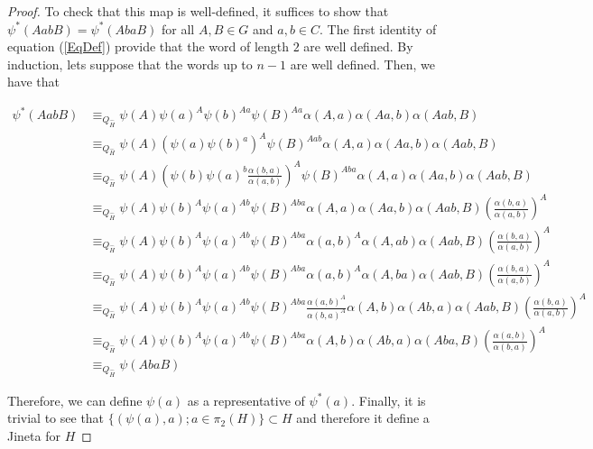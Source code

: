 \documentclass{article}
\begin{document}
\begin{proof}
    To check that this map is well-defined, it suffices to show that $\psi^*(AabB) = \psi^*(AbaB)$ for all $A, B \in G$ and $a, b \in C$. The first identity of equation (\ref{EqDef}) provide that the word of length $2$ are well defined. By induction, lets suppose that the words up to $n-1$ are well defined. Then, we have that
    
    \begin{align*}
        \psi^*(AabB) & \equiv_{Q_{\hat{H}}} \psi(A)\psi(a)^A \psi(b)^{Aa} \psi(B)^{Aa} \alpha(A,a)\alpha(Aa,b)\alpha(Aab,B) \\ 
        & \equiv_{Q_{\hat{H}}} \psi(A) \left(\psi(a) \psi(b)^{a}\right)^{A} \psi(B)^{Aab} \alpha(A,a)\alpha(Aa,b)\alpha(Aab,B) \\ 
        & \equiv_{Q_{\hat{H}}} \psi(A) \left(\psi(b) \psi(a)^{b} \frac{\alpha(b,a)}{\alpha(a,b)}\right)^{A} \psi(B)^{Aba} \alpha(A,a)\alpha(Aa,b)\alpha(Aab,B) \\ 
        & \equiv_{Q_{\hat{H}}} \psi(A) \psi(b)^A \psi(a)^{Ab}  \psi(B)^{Aba} \alpha(A,a)\alpha(Aa,b)\alpha(Aab,B) \left(\frac{\alpha(b,a)}{\alpha(a,b)}\right)^{A} \\ 
        & \equiv_{Q_{\hat{H}}} \psi(A) \psi(b)^A \psi(a)^{Ab}  \psi(B)^{Aba} \alpha(a,b)^A\alpha(A,ab)\alpha(Aab,B) \left(\frac{\alpha(b,a)}{\alpha(a,b)}\right)^{A}\\
        & \equiv_{Q_{\hat{H}}} \psi(A) \psi(b)^A \psi(a)^{Ab}  \psi(B)^{Aba} \alpha(a,b)^A\alpha(A,ba)\alpha(Aab,B)\left(\frac{\alpha(b,a)}{\alpha(a,b)}\right)^{A} \\ 
        & \equiv_{Q_{\hat{H}}} \psi(A) \psi(b)^A \psi(a)^{Ab}  \psi(B)^{Aba} \frac{\alpha(a,b)^A}{\alpha(b,a)^A}\alpha(A,b) \alpha(Ab,a)\alpha(Aab,B) \left(\frac{\alpha(b,a)}{\alpha(a,b)}\right)^{A}\\ 
        & \equiv_{Q_{\hat{H}}} \psi(A) \psi(b)^A \psi(a)^{Ab}  \psi(B)^{Aba} \alpha(A,b)\alpha(Ab,a)\alpha(Aba,B) \left(\frac{\alpha(a,b)}{\alpha(b,a)}\right)^{A} \\ 
        & \equiv_{Q_{\hat{H}}} \psi(AbaB)
    \end{align*}

    Therefore, we can define $\psi(a)$ as a representative of $\psi^*(a)$. Finally, it is trivial to see that $\{(\psi(a),a) ; a \in \pi_2(H)\} \subset H$ and therefore it define a Jineta for $H$
\end{proof}
\end{document}
